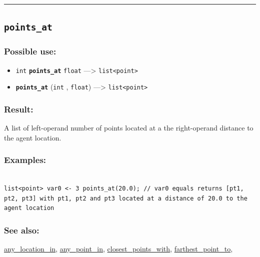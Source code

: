 \documentclass[]{book}
\providecommand{\tightlist}{%
  \setlength{\itemsep}{0pt}\setlength{\parskip}{0pt}}
\theoremstyle{definition}
\theoremstyle{definition}
\theoremstyle{definition}
\theoremstyle{remark}
\begin{document}
\begin{center}\rule{0.5\linewidth}{\linethickness}\end{center}

\subsection{\texorpdfstring{\texttt{points\_at}}{points\_at}}\label{points_at}

\subsubsection{Possible use:}\label{possible-use-410}

\begin{itemize}
\tightlist
\item
  \texttt{int} \textbf{\texttt{points\_at}} \texttt{float}
  ---\textgreater{} \texttt{list\textless{}point\textgreater{}}
\item
  \textbf{\texttt{points\_at}} (\texttt{int} , \texttt{float})
  ---\textgreater{} \texttt{list\textless{}point\textgreater{}}
\end{itemize}

\subsubsection{Result:}\label{result-396}

A list of left-operand number of points located at a the right-operand
distance to the agent location.

\subsubsection{Examples:}\label{examples-284}

\begin{verbatim}
 
list<point> var0 <- 3 points_at(20.0); // var0 equals returns [pt1, pt2, pt3] with pt1, pt2 and pt3 located at a distance of 20.0 to the agent location
\end{verbatim}

\subsubsection{See also:}\label{see-also-163}

\href{operators-a-to-a.html\#any_location_in}{any\_location\_in},
\href{operators-a-to-a.html\#any_point_in}{any\_point\_in},
\href{operators-b-to-c.html\#closest_points_with}{closest\_points\_with},
\href{operators-d-to-h.html\#farthest_point_to}{farthest\_point\_to},
\end{document}

